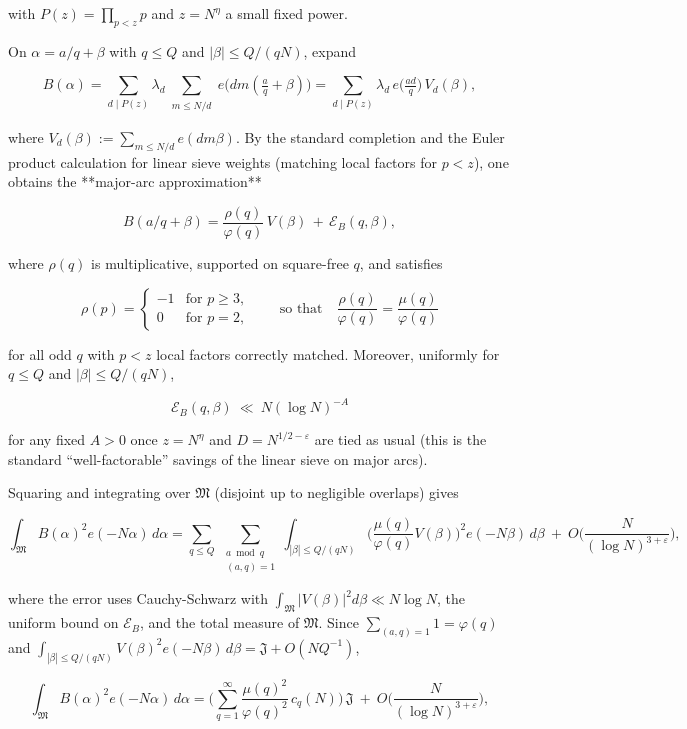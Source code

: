 \documentclass[11pt]{article}
\theoremstyle{definition}
\theoremstyle{remark}
\begin{document}
with $P(z)=\prod_{p<z}p$ and $z=N^{\eta}$ a small fixed power.

On $\alpha=a/q+\beta$ with $q\le Q$ and $|\beta|\le Q/(qN)$, expand

$$
B(\alpha)=\sum_{d\mid P(z)}\lambda_d
\sum_{\substack{m\le N/d}} e\!\big(dm(\tfrac aq+\beta)\big)
=\sum_{d\mid P(z)}\lambda_d\, e\!\big(\tfrac{ad}{q}\big)\,V_d(\beta),
$$

where $V_d(\beta):=\sum_{m\le N/d}e(dm\beta)$. By the standard completion and the Euler product calculation for linear sieve weights (matching local factors for $p<z$), one obtains the **major-arc approximation**

$$
B(a/q+\beta)=\frac{\rho(q)}{\varphi(q)}\,V(\beta)\,+\,\mathcal E_B(q,\beta),
$$

where $\rho(q)$ is multiplicative, supported on square-free $q$, and satisfies

$$
\rho(p)=
\begin{cases}
-1& \text{for } p\ge 3,\\
0 & \text{for } p=2,
\end{cases}
\qquad\text{so that}\quad \frac{\rho(q)}{\varphi(q)}=\frac{\mu(q)}{\varphi(q)}
$$

for all odd $q$ with $p<z$ local factors correctly matched. Moreover, uniformly for $q\le Q$ and $|\beta|\le Q/(qN)$,

$$
\mathcal E_B(q,\beta)\ \ll\ N(\log N)^{-A}
$$

for any fixed $A>0$ once $z=N^\eta$ and $D=N^{1/2-\varepsilon}$ are tied as usual (this is the standard “well-factorable” savings of the linear sieve on major arcs).

Squaring and integrating over $\mathfrak M$ (disjoint up to negligible overlaps) gives

$$
\int_{\mathfrak M} B(\alpha)^2 e(-N\alpha)\,d\alpha
= \sum_{q\le Q}\ \sum_{\substack{a\bmod q\\(a,q)=1}}
\int_{|\beta|\le Q/(qN)} 
\Big(\frac{\mu(q)}{\varphi(q)}V(\beta)\Big)^{\!2} e(-N\beta)\,d\beta
\ +\ O\!\Big(\frac{N}{(\log N)^{3+\varepsilon}}\Big),
$$

where the error uses Cauchy-Schwarz with $\int_{\mathfrak M}|V(\beta)|^2 d\beta\ll N\log N$, the uniform bound on $\mathcal E_B$, and the total measure of $\mathfrak M$.
Since $\sum_{(a,q)=1}1=\varphi(q)$ and $\int_{|\beta|\le Q/(qN)}V(\beta)^2 e(-N\beta)\,d\beta=\mathfrak J+O(NQ^{-1})$,

$$
\int_{\mathfrak M} B(\alpha)^2 e(-N\alpha)\,d\alpha
= \Big(\sum_{q=1}^{\infty}\frac{\mu(q)^2}{\varphi(q)^2}\,c_q(N)\Big)\,\mathfrak J
\ +\ O\!\Big(\frac{N}{(\log N)^{3+\varepsilon}}\Big),
$$
\end{document}
